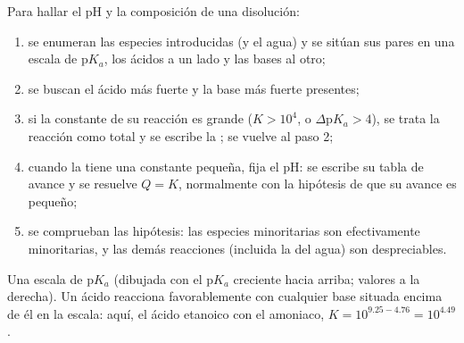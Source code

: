 \begin{method}\label{met:b1:predominant-reaction:method}
Para hallar el pH y la composición de una disolución:
\begin{enumerate}
  \item se enumeran las especies introducidas (y el agua) y se sitúan sus
        pares en una escala de $\mathrm{p}K_a$, los ácidos a un lado y las
        bases al otro;
  \item se buscan el ácido más fuerte y la base más fuerte presentes;
  \item si la constante de su reacción es grande ($K > 10^4$, o
        $\Delta\mathrm{p}K_a > 4$), se trata la reacción como total y se
        escribe la ; se vuelve al paso 2;
  \item cuando la  tiene una constante pequeña, fija
        el pH: se escribe su tabla de avance y se resuelve $Q = K$,
        normalmente con la hipótesis de que su avance es pequeño;
  \item se comprueban las hipótesis: las especies minoritarias son
        efectivamente minoritarias, y las demás reacciones (incluida la
         del agua) son despreciables.
\end{enumerate}
\end{method}

\begin{omfigure}

{\small Una escala de $\mathrm{p}K_a$ (dibujada con el p$K_a$ creciente
hacia arriba; valores a la derecha). Un ácido reacciona favorablemente
con cualquier base situada encima de él en la escala: aquí, el ácido
etanoico con el amoniaco,
$K = 10^{9.25 - 4.76} = 10^{4.49}$.}
\end{omfigure}

